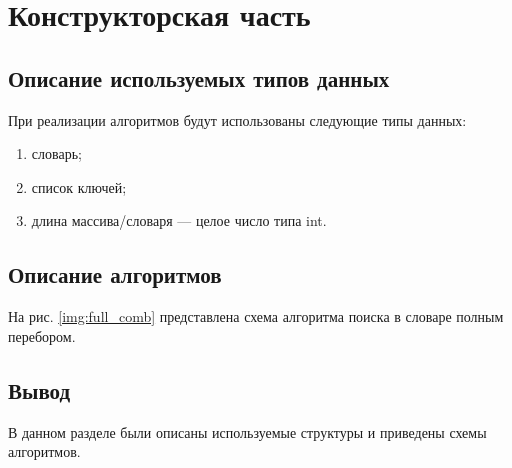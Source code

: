 \chapter{Конструкторская часть}

\section{Описание используемых типов данных}
При реализации алгоритмов будут использованы следующие типы данных:
\begin{enumerate}[label=\arabic*), itemindent=1em]
	\item словарь;
	\item список ключей;
	\item длина массива/словаря --- целое число типа int.
\end{enumerate}

\section{Описание алгоритмов}
На рис. \ref{img:full_comb} представлена схема алгоритма поиска в словаре полным перебором.
\begin{center}	
	\centering
	\def\svgwidth{10cm}
	
	\label{img:full_comb}
\end{center}
\section*{\hsp Вывод}
В данном разделе были описаны используемые структуры и приведены схемы алгоритмов.